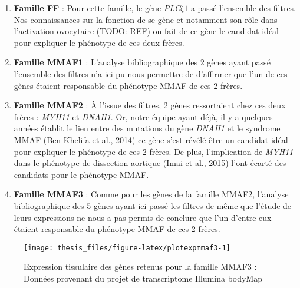 \documentclass[12pt,twoside]{reedthesis}
\providecommand{\tightlist}{%
  \setlength{\itemsep}{0pt}\setlength{\parskip}{0pt}}
\theoremstyle{definition}
\theoremstyle{definition}
\theoremstyle{remark}
\begin{document}
  \begin{enumerate}
  \def\labelenumi{\arabic{enumi}.}
  \setcounter{enumi}{1}
  \tightlist
  \item
    \textbf{Famille FF} : Pour cette famille, le gène
    \emph{PLC}\(\zeta 1\) a passé l'ensemble des filtres. Nos
    connaissances sur la fonction de se gène et notamment son rôle dans
    l'activation ovocytaire (TODO: REF) on fait de ce gène le candidat
    idéal pour expliquer le phénotype de ces deux frères.\\
  \item
    \textbf{Famille MMAF1} : L'analyse bibliographique des 2 gènes ayant
    passé l'ensemble des filtres n'a ici pu nous permettre de d'affirmer
    que l'un de ces gènes étaient responsable du phénotype MMAF de ces 2
    frères.\\
  \item
    \textbf{Famille MMAF2} : À l'issue des filtres, 2 gènes ressortaient
    chez ces deux frères : \emph{MYH11} et \emph{DNAH1}. Or, notre équipe
    ayant déjà, il y a quelques années établit le lien entre des mutations
    du gène \emph{DNAH1} et le syndrome MMAF (Ben Khelifa et al.,
    \protect\hyperlink{ref-BenKhelifa2014}{2014}) ce gène s'est révélé
    être un candidat idéal pour expliquer le phénotype de ces 2 frères. De
    plus, l'implication de \emph{MYH11} dans le phénotype de dissection
    aortique (Imai et al., \protect\hyperlink{ref-Imai2015}{2015}) l'ont
    écarté des candidats pour le phénotype MMAF.\\
  \item
    \textbf{Famille MMAF3} : Comme pour les gènes de la famille MMAF2,
    l'analyse bibliographique des 5 gènes ayant ici passé les filtres de
    même que l'étude de leurs expressions ne nous a pas permis de conclure
    que l'un d'entre eux étaient responsable du phénotype MMAF de ces 2
    frères.
  \end{enumerate}
  
  \begin{figure}
  
  {\centering \texttt{[image: thesis\_files/figure-latex/plotexpmmaf3-1]} 
  
  }
  
  \caption[Expression tissulaire des gènes retenus pour la famille MMAF3]{Expression tissulaire des gènes retenus pour la famille MMAF3 : Données provenant du projet de transcriptome Illumina bodyMap}\label{fig:plotexpmmaf3}
  \end{figure}
  
\end{document}
